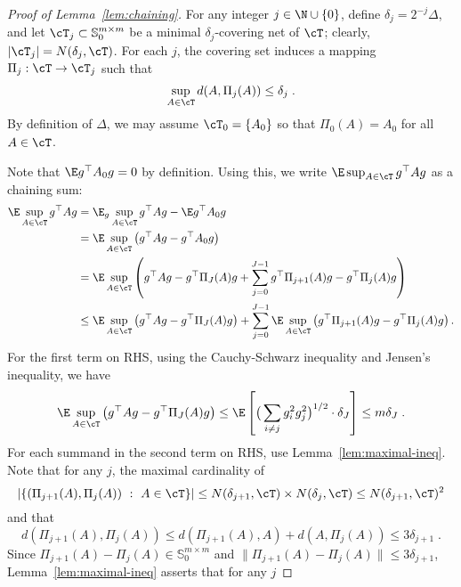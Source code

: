 \documentclass[11pt]{article}
\begin{document}
\begin{proof}[Proof of Lemma~\ref{lem:chaining}]
	For any integer $j \in \N \cup \{0\}$, define $\delta_j = 2^{-j} \Delta$, and let $\cT_{j} \subset \mathbb{S}_0^{m \times m}$ be a minimal $\delta_j$-covering net of $\cT$; clearly, $|\cT_j| = N(\delta_j, \cT)$. For each $j$, the covering set induces a mapping $\Pi_j : \cT \rightarrow \cT_j$ such that
	\begin{align*}
		\sup_{A \in \cT} d(A, \Pi_j(A)) \leq \delta_j \;.
	\end{align*}
	By definition of $\Delta$, we may assume $\cT_0 = \{A_0\}$ so that $\Pi_0(A) = A_0$ for all $A \in \cT$.

	Note that $\E g^\top A_0 g = 0$ by definition. Using this, we write $\E \sup_{A \in \cT} g^\top A g$ as a chaining sum:
	\begin{align*}
		\E \sup_{A \in \cT} g^\top A g
		& = \E_{g} \sup_{A \in \cT} g^\top A g - \E g^\top A_0 g \\ 
		& = \E \sup_{A \in \cT} \left(g^\top A g  - g^\top A_0 g  \right) \\
		& = \E \sup_{A \in \cT} \left( g^\top A g  - g^\top \Pi_J(A) g + \sum_{j=0}^{J-1} g^\top \Pi_{j+1}(A) g -  g^\top \Pi_{j}(A) g \right) \\
		& \leq \E \sup_{A \in \cT}  \left( g^\top A g  - g^\top \Pi_J(A) g \right) + \sum_{j=0}^{J-1} \E \sup_{A \in \cT} \left( g^\top \Pi_{j+1}(A) g -  g^\top \Pi_{j}(A) g \right).
	\end{align*}
	For the first term on RHS, using the Cauchy-Schwarz inequality and Jensen's inequality, we have
	\begin{align*}
		\E \sup_{A \in \cT} \left( g^\top A g  - g^\top \Pi_J(A) g \right) \leq \E \left[  \big(\sum_{i\neq j} g_i^2 g_j^2 \big)^{1/2} \cdot \delta_J \right]  \leq m \delta_J \;.
	\end{align*}
	For each summand in the second term on RHS, use Lemma~\ref{lem:maximal-ineq}. Note that for any $j$, the maximal cardinality of
	\begin{equation*}
		| \{ (\Pi_{j+1}(A), \Pi_{j}(A)) ~:~ A \in \cT \} | \leq N(\delta_{j+1}, \cT) \times N(\delta_{j}, \cT) \leq N(\delta_{j+1}, \cT)^2
	\end{equation*}
	and that
	\begin{equation*}
		d(\Pi_{j+1}(A), \Pi_{j}(A)) \leq  d(\Pi_{j+1}(A), A) + d(A, \Pi_{j}(A)) \leq 3 \delta_{j+1} \;.
	\end{equation*}
	Since $\Pi_{j + 1}(A) - \Pi_j(A) \in \mathbb{S}_0^{m \times m}$ and $\|\Pi_{j + 1}(A) - \Pi_j(A)\| \le 3 \delta_{j + 1}$, Lemma~\ref{lem:maximal-ineq} asserts that for any $j$ 

\end{proof}
\end{document}
